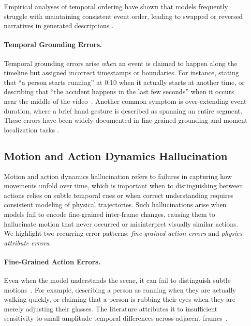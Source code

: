 \documentclass[10pt]{article} %
\begin{document}
Empirical analyses of temporal ordering have shown that models frequently struggle with maintaining consistent event order, leading to swapped or reversed narratives in generated descriptions \citep{ahn2025happens, Xue2025SeeingTA}.

\paragraph{Temporal Grounding Errors.}
Temporal grounding errors arise \emph{when} an event is claimed to happen along the timeline but assigned incorrect timestamps or boundaries. For instance, stating that ``a person starts running'' at 0:10 when it actually starts at another time, or describing that ``the accident happens in the last few seconds'' when it occurs near the middle of the video~\citep{guo2025vtg,chen2024timemarker}. Another common symptom is over-extending event duration, where a brief hand gesture is described as spanning an entire segment. These errors have been widely documented in fine-grained grounding and moment localization tasks \citep{huang2024vtimellm, wang2024grounded, wu2025number, pramanick2025enrich}.

\subsection{Motion and Action Dynamics Hallucination}
\label{subsec:motion-hallucination}

Motion and action dynamics hallucination refers to failures in capturing how movements unfold over time, which is important when to distinguishing between actions relies on subtle temporal cues or when correct understanding requires consistent modeling of physical trajectories. Such hallucinations arise when models fail to encode fine-grained inter-frame changes, causing them to hallucinate motion that never occurred or misinterpret visually similar actions. We highlight two recurring error patterns: \emph{fine-grained action errors} and \emph{physics attribute errors}.

\paragraph{Fine-Grained Action Errors.}
Even when the model understands the scene, it can fail to distinguish subtle motions~\citep{du2025motionsight, hong2025motionbench}. %
For example, describing a person as running when they are actually walking quickly, or claiming that a person is rubbing their eyes when they are merely adjusting their glasses. The literature attributes it to insufficient sensitivity to small-amplitude temporal differences across adjacent frames~\citep{shao2020finegym, liu2022fineaction}.
\end{document}
